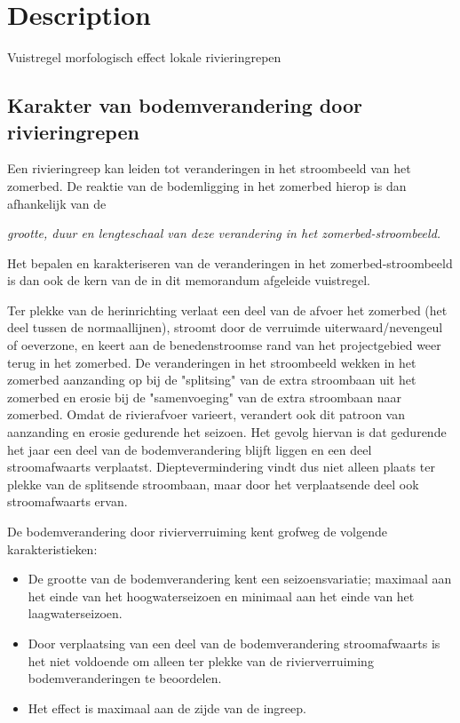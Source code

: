 \chapter{Description}

Vuistregel morfologisch effect lokale rivieringrepen

\section{Karakter van bodemverandering door rivieringrepen}

Een rivieringreep kan leiden tot veranderingen in het stroombeeld van het zomerbed.
De reaktie van de bodemligging in het zomerbed hierop is dan afhankelijk van de

\hspace{1cm}\emph{grootte, duur en lengteschaal van deze verandering in het zomerbed-stroombeeld.}

Het bepalen en karakteriseren van de veranderingen in het zomerbed-stroombeeld is dan ook de kern van de in dit memorandum afgeleide vuistregel.

Ter plekke van de herinrichting verlaat een deel van de afvoer het zomerbed (het deel tussen de normaallijnen), stroomt door de verruimde uiterwaard/nevengeul of oeverzone, en keert aan de benedenstroomse rand van het projectgebied weer terug in
het zomerbed.
De veranderingen in het stroombeeld wekken in het zomerbed aanzanding op bij de "splitsing" van de extra stroombaan uit het zomerbed en erosie bij de "samenvoeging" van de extra stroombaan naar zomerbed.
Omdat de rivierafvoer varieert, verandert ook dit patroon van aanzanding en erosie gedurende het seizoen.
Het gevolg hiervan is dat gedurende het jaar een deel van de bodemverandering blijft liggen en een deel stroomafwaarts verplaatst.
Dieptevermindering vindt dus niet alleen plaats ter plekke van de splitsende stroombaan, maar door het verplaatsende deel ook
stroomafwaarts ervan.

De bodemverandering door rivierverruiming kent grofweg de volgende karakteristieken:

\begin{itemize}
\item De grootte van de bodemverandering kent een seizoensvariatie; maximaal aan het einde van het hoogwaterseizoen en minimaal aan het einde van het laagwaterseizoen.

\item Door verplaatsing van een deel van de bodemverandering stroomafwaarts is het niet voldoende om alleen ter plekke van de rivierverruiming bodemveranderingen te beoordelen.

\item Het effect is maximaal aan de zijde van de ingreep.
\end{itemize}

